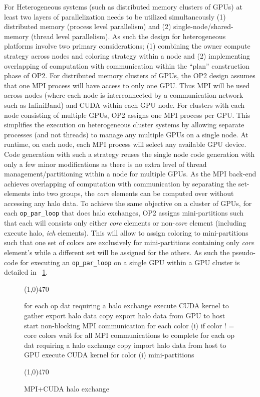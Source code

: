 \documentclass[11pt]{article}
\begin{document}
For Heterogeneous systems (such as distributed memory clusters of GPUs) at least two layers of parallelization needs to
be utilized simultaneously (1) distributed memory (process level parallelism) and (2) single-node/shared-memory (thread
level parallelism). As such the design for heterogeneous platforms involve two primary considerations; (1) combining the
owner compute strategy across nodes and coloring strategy within a node and (2) implementing overlapping of computation
with communication within the ``plan'' construction phase of OP2. For distributed memory clusters of GPUs, the OP2
design assumes that one MPI process will have access to only one GPU. Thus MPI will be used across nodes (where each
node is interconnected by a communication network such as InfiniBand) and CUDA within each GPU node. For clusters with
each node consisting of multiple GPUs, OP2 assigns one MPI process per GPU. This simplifies the execution on
heterogeneous cluster systems by allowing separate processes (and not threads) to manage any multiple GPUs on a single
node. At runtime, on each node, each MPI process will select any available GPU device. Code generation with such a
strategy reuses the single node code generation with only a few minor modifications as there is no extra level of thread
management/partitioning within a node for multiple GPUs. As the MPI back-end achieves overlapping of computation with
communication by separating the set-elements into two groups, the \textit{core} elements can be computed over without
accessing any halo data. To achieve the same objective on a cluster of GPUs, for each \texttt{op\_par\_loop} that does
halo exchanges, OP2 assigns mini-partitions such that each will consists only either \textit{core} elements or
non-\textit{core} element (including execute halo, \textit{ieh} elements). This will allow to assign coloring to
mini-partitions such that one set of colors are exclusively for mini-partitions containing only \textit{core} element's
while a different set will be assigned for the others. As such the pseudo-code for executing an \texttt{op\_par\_loop}
on a single GPU within a GPU cluster is detailed in \figurename{~\ref{fig:mpi_cuda_exchange}}.

\begin{figure}[t]\small
\vspace{-0pt}\noindent\line(1,0){470}\vspace{-10pt}
\begin{pyglist}[language=c]
for each op dat requiring a halo exchange {
  execute CUDA kernel to gather export halo data
  copy export halo data from GPU to host
  start non-blocking MPI communication
}
for each color (i) {
  if color ! = core colors {
    wait for all MPI communications to complete
    for each op dat requiring a halo exchange
      copy import halo data from host to GPU
  }
  execute CUDA kernel for color (i) mini-partitions
}
\end{pyglist}
\vspace{-10pt}\noindent\line(1,0){470}\vspace{-10pt}
\caption{\small MPI+CUDA halo exchange}
\normalsize\vspace{-0pt}\label{fig:mpi_cuda_exchange}
\end{figure}
\end{document}
